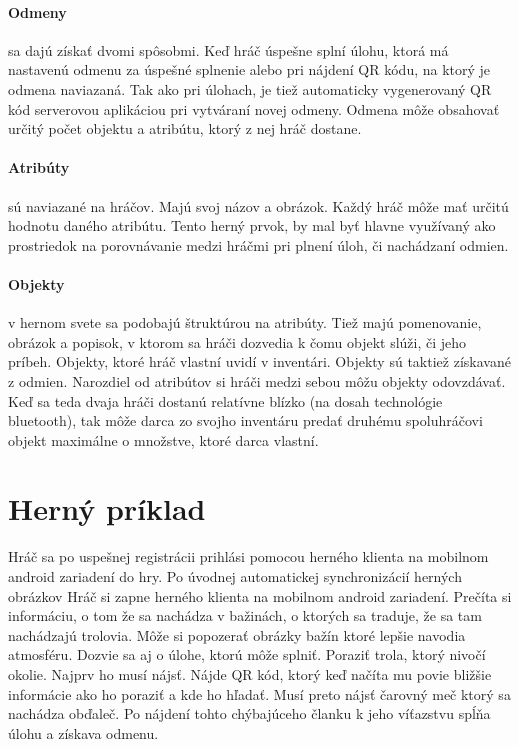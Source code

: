 \paragraph{Odmeny} sa dajú získať dvomi spôsobmi. Keď hráč úspešne splní úlohu, ktorá má nastavenú odmenu za úspešné splnenie alebo pri nájdení QR kódu, na ktorý je odmena naviazaná. Tak ako pri úlohach, je tiež automaticky vygenerovaný QR kód serverovou aplikáciou pri vytváraní novej odmeny. Odmena môže obsahovať určitý počet objektu a atribútu, ktorý z nej hráč dostane.

\paragraph{Atribúty} sú naviazané na hráčov. Majú svoj názov a obrázok. Každý hráč môže mať určitú hodnotu daného atribútu. Tento herný prvok, by mal byť hlavne využívaný ako prostriedok na porovnávanie medzi hráčmi pri plnení úloh, či nachádzaní odmien. 

\paragraph{Objekty} v hernom svete sa podobajú štruktúrou na atribúty. Tiež majú pomenovanie, obrázok a popisok, v ktorom sa hráči dozvedia k čomu objekt slúži, či jeho príbeh. Objekty, ktoré hráč vlastní uvidí v inventári. Objekty sú taktiež získavané z odmien. Narozdiel od atribútov si hráči medzi sebou môžu objekty odovzdávať. Keď sa teda dvaja hráči dostanú relatívne blízko (na dosah technológie bluetooth), tak môže darca zo svojho inventáru predať druhému spoluhráčovi objekt maximálne o množstve, ktoré darca vlastní.

\section{Herný príklad}
Hráč sa po uspešnej registrácii prihlási pomocou herného klienta na mobilnom android zariadení do hry. Po úvodnej automatickej synchronizácií herných obrázkov 
Hráč si zapne herného klienta na mobilnom android zariadení. Prečíta si informáciu, o tom že sa nachádza v bažinách, o ktorých sa traduje, že sa tam nachádzajú trolovia. Môže si popozerať obrázky bažín ktoré lepšie navodia atmosféru. Dozvie sa aj o úlohe, ktorú môže splniť. Poraziť trola, ktorý nivočí okolie. Najprv ho musí nájsť. Nájde QR kód, ktorý keď načíta mu povie bližšie informácie ako ho poraziť a kde ho hľadať. Musí preto nájsť čarovný meč ktorý sa nachádza obďaleč. Po nájdení tohto chýbajúceho članku k jeho víťazstvu spĺňa úlohu a získava odmenu.

